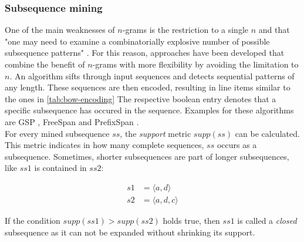 \subsubsection*{Subsequence mining}
One of the main weaknesses of $n$-grams is the restriction to a single $n$ and that "one may need to examine a combinatorially explosive
number of possible subsequence patterns" \cite{pei2001prefixspan}. For this reason, approaches have been developed that combine the benefit of $n$-grams with more flexibility by avoiding the limitation to $n$. An algorithm sifts through input sequences and detects sequential patterns of any length. These sequences are then encoded, resulting in line items similar to the ones in \autoref{tab:bow-encoding} The respective boolean entry denotes that a specific subsequence has occured in the sequence.
Examples for these algorithms are GSP \cite{srikant1996gsp}, FreeSpan \cite{han2000freespan} and PrefixSpan \cite{pei2001prefixspan}.\\

For every mined subsequence $ss$, the \textit{support} metric $supp(ss)$ can be calculated. This metric indicates in how many complete sequences, $ss$ occurs as a subsequence. Sometimes, shorter subsequences are part of longer subsequences, like $ss1$ is contained in $ss2$:

\begin{equation*}
\begin{split}
s1 &= \langle a,d \rangle\\
s2 &= \langle a,d,c \rangle
\end{split}
\end{equation*}

If the condition $supp(ss1) > supp(ss2)$ holds true, then $ss1$ is called a \textit{closed} subsequence as it can not be expanded without shrinking its support.
